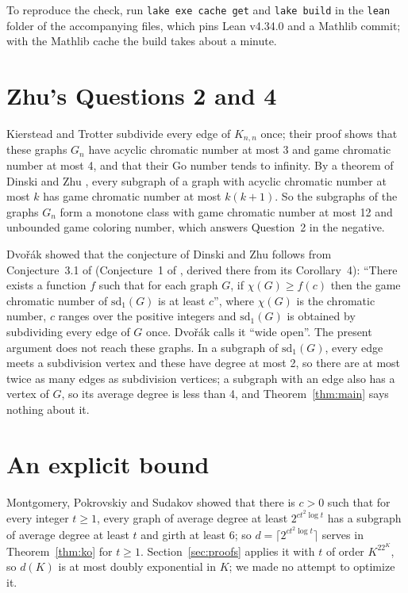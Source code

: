 \documentclass[11pt]{article}
\theoremstyle{remark}
\begin{document}
\begin{appendices}
To reproduce the check, run \texttt{lake exe cache get} and
\texttt{lake build} in the \texttt{lean} folder of the accompanying files,
which pins Lean v4.34.0 and a Mathlib commit; with the Mathlib cache the
build takes about a minute.

\section{Zhu's Questions 2 and 4}\label{app:related}
Kierstead and
Trotter \cite[Example~6.1]{KT} subdivide every edge of $K_{n,n}$ once;
their proof shows that these graphs $G_n$ have acyclic chromatic number at
most 3 and game chromatic number at most 4, and that their Go number tends
to infinity. By a theorem of Dinski and Zhu \cite[Theorem~2]{DZ}, every
subgraph of a graph with acyclic chromatic number at most $k$ has game
chromatic number at most $k(k+1)$. So the subgraphs of the graphs $G_n$
form a monotone class with game chromatic number at most 12 and unbounded
game coloring number, which answers Question~2 in the negative.

Dvořák \cite[Section~3.1.5]{Dv} showed that the conjecture of Dinski and
Zhu follows from Conjecture~3.1 of \cite{Dv} (Conjecture~1 of \cite{Dv08}, derived there from
its Corollary~4): ``There exists a function $f$ such that for each graph
$G$, if $\chi(G)\ge f(c)$ then the game chromatic number of
$\mathrm{sd}_1(G)$ is at least $c$'', where $\chi(G)$ is the chromatic
number, $c$ ranges over the positive integers and $\mathrm{sd}_1(G)$ is
obtained by subdividing every edge of $G$ once. Dvořák calls it ``wide
open''. The present argument does not reach these graphs. In a subgraph of
$\mathrm{sd}_1(G)$, every edge meets a subdivision vertex and these have
degree at most 2, so there are at most twice as many edges as subdivision
vertices; a subgraph with an edge also has a vertex of $G$, so its average
degree is less than 4, and Theorem~\ref{thm:main} says nothing about it.
\section{An explicit bound}\label{app:bound}
Montgomery, Pokrovskiy and Sudakov \cite[Theorem~1.1]{MPS} showed that
there is $c>0$ such that for every integer $t\ge1$, every graph of average
degree at least $2^{ct^2\log t}$ has a subgraph of average degree at least
$t$ and girth at least 6; so $d=\lceil2^{ct^2\log t}\rceil$ serves in
Theorem~\ref{thm:ko} for $t\ge1$. Section~\ref{sec:proofs} applies it with $t$ of order
$K^22^K$, so $d(K)$ is at most doubly exponential in $K$; we made no
attempt to optimize it.
\end{appendices}
\end{document}
